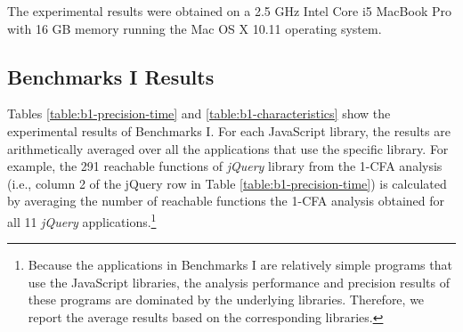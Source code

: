 

The experimental results were obtained on a 2.5 GHz Intel Core i5 MacBook Pro with 16 GB memory running the Mac OS X 10.11 operating system.


\subsection{Benchmarks I Results}
\label{b1-res}

Tables \ref{table:b1-precision-time} and \ref{table:b1-characteristics} show the experimental results of Benchmarks I. For each JavaScript library, the results are arithmetically averaged over all the applications that use the specific library. For example, the 291 reachable functions of {\it jQuery} library from the 1-CFA analysis (i.e., column 2 of the jQuery row in Table \ref{table:b1-precision-time}) is calculated by averaging the number of reachable functions the 1-CFA analysis obtained for all 11 {\it jQuery} applications.\footnote{Because the applications in Benchmarks I are relatively simple programs that use the JavaScript libraries, the analysis performance and precision results of these programs are dominated by the underlying libraries. Therefore, we report the average results based on the corresponding libraries.} 

